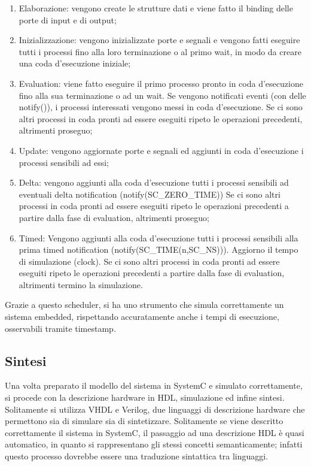 \documentclass[a4paper,titlepage]{book}
\begin{document}
\begin{enumerate}
\item Elaborazione: vengono create le strutture dati e viene fatto il binding delle porte di input e di output;
\item Inizializzazione: vengono inizializzate porte e segnali e vengono fatti eseguire tutti i processi fino alla loro terminazione o al primo wait, in modo da creare una coda d'esecuzione iniziale;
\item Evaluation: viene fatto eseguire il primo processo pronto in coda d'esecuzione fino alla sua terminazione o ad un wait. Se vengono notificati eventi (con delle notify()), i processi interessati vengono messi in coda d'esecuzione. Se ci sono altri processi in coda pronti ad essere eseguiti ripeto le operazioni precedenti, altrimenti proseguo;
\item Update: vengono aggiornate porte e segnali ed aggiunti in coda d'esecuzione i processi sensibili ad essi;
\item Delta: vengono aggiunti alla coda d'esecuzione tutti i processi sensibili ad eventuali delta notification (notify(SC\_ZERO\_TIME)) Se ci sono altri processi in coda pronti ad essere eseguiti ripeto le operazioni precedenti a partire dalla fase di evaluation, altrimenti proseguo;
\item Timed: Vengono aggiunti alla coda d'esecuzione tutti i processi sensibili alla prima timed notification (notify(SC\_TIME(n,SC\_NS))). Aggiorno il tempo di simulazione (clock). Se ci sono altri processi in coda pronti ad essere eseguiti ripeto le operazioni precedenti a partire dalla fase di evaluation, altrimenti termino la simulazione.
\end{enumerate}

Grazie a questo scheduler, si ha uno strumento che simula correttamente un sistema embedded, rispettando accuratamente anche i tempi di esecuzione, osservabili tramite timestamp.

\subsection{Sintesi}

Una volta preparato il modello del sistema in SystemC e simulato correttamente, si procede con la descrizione hardware in HDL, simulazione ed infine sintesi. Solitamente si utilizza VHDL e Verilog, due linguaggi di descrizione hardware che permettono sia di simulare sia di sintetizzare. Solitamente se viene descritto correttamente il sistema in SystemC, il passaggio ad una descrizione HDL è quasi automatico, in quanto si rappresentano gli stessi concetti semanticamente; infatti questo processo dovrebbe essere una traduzione sintattica tra linguaggi.
\end{document}
